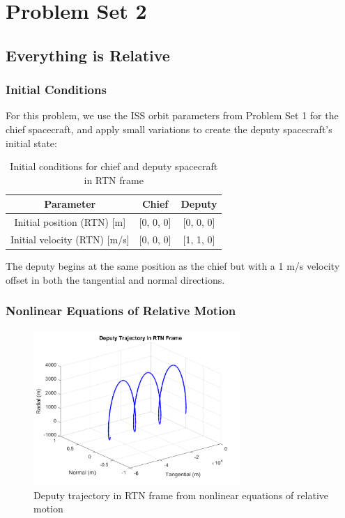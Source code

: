 \section{Problem Set 2}

\subsection{Everything is Relative}

\subsubsection{Initial Conditions}
For this problem, we use the ISS orbit parameters from Problem Set 1 for the chief spacecraft, and apply small variations to create the deputy spacecraft's initial state:

\begin{table}[H]
    \centering
    \begin{tabular}{ccc} \hline
        \textbf{Parameter} & \textbf{Chief} & \textbf{Deputy} \\ \hline 
        Initial position (RTN) [m] & [0, 0, 0] & [0, 0, 0] \\
        Initial velocity (RTN) [m/s] & [0, 0, 0] & [1, 1, 0] \\ \hline
    \end{tabular}
    \caption{Initial conditions for chief and deputy spacecraft in RTN frame}
    \label{tab:relative_ics}
\end{table}

The deputy begins at the same position as the chief but with a 1 m/s velocity offset in both the tangential and normal directions.

\subsubsection{Nonlinear Equations of Relative Motion}

\begin{figure}[H]
    \centering
    \includegraphics[width=0.7\textwidth]{PS2/Figures/Case1_RelativeTrajectory.png}
    \caption{Deputy trajectory in RTN frame from nonlinear equations of relative motion}
    \label{fig:relative_trajectory}
\end{figure}

